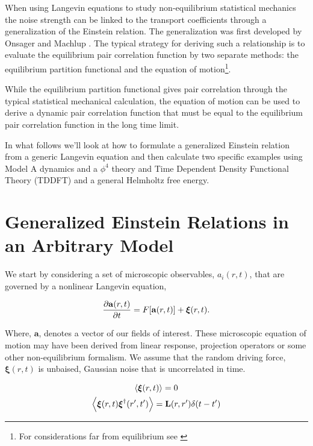 When using Langevin equations to study non-equilibrium statistical mechanics
the noise strength can be linked to the transport coefficients through a
generalization of the Einstein relation. The generalization was first developed
by Onsager and Machlup \cite{OnsagerMachlup}. The typical strategy for deriving
such a relationship is to evaluate the equilibrium pair correlation function by
two separate methods: the equilibrium partition functional and the equation of
motion\footnote{For considerations far from equilibrium see \cite{Lax, Ronis,
Fox_and_Uhlenbeck}}.

While the equilibrium partition functional gives pair correlation through the
typical statistical mechanical calculation, the equation of motion can be used
to derive a dynamic pair correlation function that must be equal to the
equilibrium pair correlation function in the long time limit.

In what follows we'll look at how to formulate a generalized Einstein relation
from a generic Langevin equation and then calculate two specific examples using
Model A dynamics and a $\phi^4$ theory and Time Dependent Density Functional
Theory (TDDFT) and a general Helmholtz free energy.

\section{Generalized Einstein Relations in an Arbitrary Model}

We start by considering a set of microscopic observables, $a_i(r, t)$, that are
governed by a nonlinear Langevin equation,

\begin{equation} \frac{\partial \mathbf{a}(r, t)}{\partial t} = F[\mathbf{a}(r,t)]
+ \boldsymbol{\xi}(r,t).  \end{equation}

Where, $\mathbf{a}$, denotes a vector of our fields of interest. These
microscopic equation of motion may have been derived from linear response,
projection operators or some other non-equilibrium formalism. We assume that
the random driving force, $\boldsymbol{\xi}(r, t)$ is unbaised, Gaussian noise
that is uncorrelated in time.

\begin{gather} \left\langle \boldsymbol{\xi}(r,t)\right\rangle = 0 \\ \left\langle
\boldsymbol{\xi}(r,t)\boldsymbol{\xi}^\dagger(r^\prime,t^\prime)\right\rangle =
\mathbf{L}(r, r^\prime)\delta(t-t^\prime) \end{gather}


